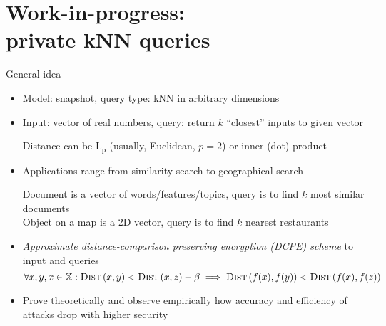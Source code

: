 \section{Work-in-progress: \\ private kNN queries}

	\begin{frame}{General idea}

		\begin{itemize}
			\item<1->
				Model: \alert{snapshot}, query type: \alert{kNN} in arbitrary dimensions

			\item<2->
				Input: vector of real numbers, query: return $k$ ``closest'' inputs to given vector \\
				\begin{small}
					Distance can be $\text{L}_\text{p}$ (usually, Euclidean, $p = 2$) or inner (dot) product
				\end{small}

			\item<3->
				Applications range from similarity search to geographical search \\
				\begin{small}
					Document is a vector of words/features/topics, query is to find $k$ most similar documents \\
					Object on a map is a 2D vector, query is to find $k$ nearest restaurants
				\end{small}

			\item<4->
				\emph{Approximate distance-comparison preserving encryption (DCPE) scheme} to input and queries
				\[
					\forall x, y, x \in \mathbb{X} : \algo{Dist}{x, y} < \algo{Dist}{x, z} - \beta \implies \algo{Dist}{f(x), f(y)} < \algo{Dist}{f(x), f(z)}
				\]

			\item<5->
				Prove theoretically and observe empirically how accuracy and efficiency of attacks drop with higher security
		\end{itemize}

	\end{frame}

